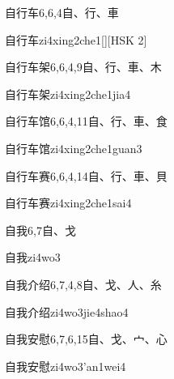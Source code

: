 \begin{entry}{自行车}{6,6,4}{⾃、⾏、⾞}
  \begin{phonetics}{自行车}{zi4xing2che1}[][HSK 2]
  \end{phonetics}
\end{entry}

\begin{entry}{自行车架}{6,6,4,9}{⾃、⾏、⾞、⽊}
  \begin{phonetics}{自行车架}{zi4xing2che1jia4}
  \end{phonetics}
\end{entry}

\begin{entry}{自行车馆}{6,6,4,11}{⾃、⾏、⾞、⾷}
  \begin{phonetics}{自行车馆}{zi4xing2che1guan3}
  \end{phonetics}
\end{entry}

\begin{entry}{自行车赛}{6,6,4,14}{⾃、⾏、⾞、⾙}
  \begin{phonetics}{自行车赛}{zi4xing2che1sai4}
  \end{phonetics}
\end{entry}

\begin{entry}{自我}{6,7}{⾃、⼽}
  \begin{phonetics}{自我}{zi4wo3}
  \end{phonetics}
\end{entry}

\begin{entry}{自我介绍}{6,7,4,8}{⾃、⼽、⼈、⽷}
  \begin{phonetics}{自我介绍}{zi4wo3jie4shao4}
  \end{phonetics}
\end{entry}

\begin{entry}{自我安慰}{6,7,6,15}{⾃、⼽、⼧、⼼}
  \begin{phonetics}{自我安慰}{zi4wo3'an1wei4}
  \end{phonetics}
\end{entry}

